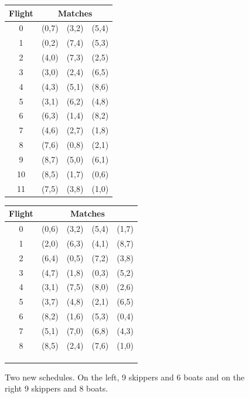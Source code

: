 \documentclass{llncs}
\begin{document}
\begin{center}
\begin{figure}[h]
\begin{minipage}[t]{0.5\textwidth}
\hspace{0.6cm}
\begin{tabular}{cccc}
        \toprule
        Flight & \multicolumn{3}{c}{Matches} \\ \midrule
        0 & (0,7) & (3,2) & (5,4) \\ 
        1 & (0,2) & (7,4) & (5,3) \\
        2 & (4,0) & (7,3) & (2,5) \\
        3 & (3,0) & (2,4) & (6,5) \\
        4 & (4,3) & (5,1) & (8,6) \\
        5 & (3,1) & (6,2) & (4,8) \\
        6 & (6,3) & (1,4) & (8,2) \\
        7 & (4,6) & (2,7) & (1,8) \\
        8 & (7,6) & (0,8) & (2,1) \\
        9 & (8,7) & (5,0) & (6,1) \\
        10 & (8,5) & (1,7) & (0,6) \\
        11 & (7,5) & (3,8) & (1,0) \\ \bottomrule
    \end{tabular}
\label{09-06}
\end{minipage}
\begin{minipage}[t]{0.5\textwidth}
\hspace{0.6cm}
\begin{tabular}{ccccc}
        \toprule
        Flight & \multicolumn{4}{c}{Matches} \\ \midrule
        0 & (0,6) & (3,2) & (5,4) & (1,7) \\
        1 & (2,0) & (6,3) & (4,1) & (8,7) \\
        2 & (6,4) & (0,5) & (7,2) & (3,8) \\
        3 & (4,7) & (1,8) & (0,3) & (5,2) \\
        4 & (3,1) & (7,5) & (8,0) & (2,6) \\
        5 & (3,7) & (4,8) & (2,1) & (6,5) \\
        6 & (8,2) & (1,6) & (5,3) & (0,4) \\
        7 & (5,1) & (7,0) & (6,8) & (4,3) \\
        8 & (8,5) & (2,4) & (7,6) & (1,0) \\ \bottomrule
        & & & & \\
        & & & & \\
        & & & & \\
    \end{tabular} 
\label{09-08}
\end{minipage}
\caption{Two new schedules. On the left, 9 skippers and 6 boats and on the right 9 skippers and 8 boats.}
\label{09}
\end{figure}
\end{center}
\end{document}
